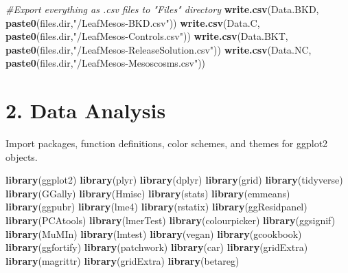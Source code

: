 \documentclass[
]{article}
\newenvironment{Shaded}{\begin{snugshade}}{\end{snugshade}}
\newcommand{\CommentTok}[1]{\textcolor[rgb]{0.56,0.35,0.01}{\textit{#1}}}
\newcommand{\FunctionTok}[1]{\textcolor[rgb]{0.13,0.29,0.53}{\textbf{#1}}}
\newcommand{\NormalTok}[1]{#1}
\newcommand{\StringTok}[1]{\textcolor[rgb]{0.31,0.60,0.02}{#1}}
\begin{document}
\begin{Shaded}
\begin{Highlighting}[]
\CommentTok{\#Export everything as .csv files to "Files" directory}
\FunctionTok{write.csv}\NormalTok{(Data.BKD, }\FunctionTok{paste0}\NormalTok{(files.dir,}\StringTok{"/LeafMesos{-}BKD.csv"}\NormalTok{))}
\FunctionTok{write.csv}\NormalTok{(Data.C, }\FunctionTok{paste0}\NormalTok{(files.dir,}\StringTok{"/LeafMesos{-}Controls.csv"}\NormalTok{))}
\FunctionTok{write.csv}\NormalTok{(Data.BKT, }\FunctionTok{paste0}\NormalTok{(files.dir,}\StringTok{"/LeafMesos{-}ReleaseSolution.csv"}\NormalTok{))}
\FunctionTok{write.csv}\NormalTok{(Data.NC, }\FunctionTok{paste0}\NormalTok{(files.dir,}\StringTok{"/LeafMesos{-}Mesoscosms.csv"}\NormalTok{))}
\end{Highlighting}
\end{Shaded}

\section{2. Data Analysis}\label{data-analysis}

Import packages, function definitions, color schemes, and themes for
ggplot2 objects.

\begin{Shaded}
\begin{Highlighting}[]
\FunctionTok{library}\NormalTok{(ggplot2)}
\FunctionTok{library}\NormalTok{(plyr)}
\FunctionTok{library}\NormalTok{(dplyr)}
\FunctionTok{library}\NormalTok{(grid)}
\FunctionTok{library}\NormalTok{(tidyverse)}
\FunctionTok{library}\NormalTok{(GGally)}
\FunctionTok{library}\NormalTok{(Hmisc)}
\FunctionTok{library}\NormalTok{(stats)}
\FunctionTok{library}\NormalTok{(emmeans)}
\FunctionTok{library}\NormalTok{(ggpubr)}
\FunctionTok{library}\NormalTok{(lme4)}
\FunctionTok{library}\NormalTok{(rstatix)}
\FunctionTok{library}\NormalTok{(ggResidpanel)}
\FunctionTok{library}\NormalTok{(PCAtools)}
\FunctionTok{library}\NormalTok{(lmerTest)}
\FunctionTok{library}\NormalTok{(colourpicker)}
\FunctionTok{library}\NormalTok{(ggsignif)}
\FunctionTok{library}\NormalTok{(MuMIn)}
\FunctionTok{library}\NormalTok{(lmtest)}
\FunctionTok{library}\NormalTok{(vegan)}
\FunctionTok{library}\NormalTok{(gcookbook)}
\FunctionTok{library}\NormalTok{(ggfortify)}
\FunctionTok{library}\NormalTok{(patchwork)}
\FunctionTok{library}\NormalTok{(car)}
\FunctionTok{library}\NormalTok{(gridExtra)}
\FunctionTok{library}\NormalTok{(magrittr)}
\FunctionTok{library}\NormalTok{(gridExtra)}
\FunctionTok{library}\NormalTok{(betareg)}
\end{Highlighting}
\end{Shaded}
\end{document}
